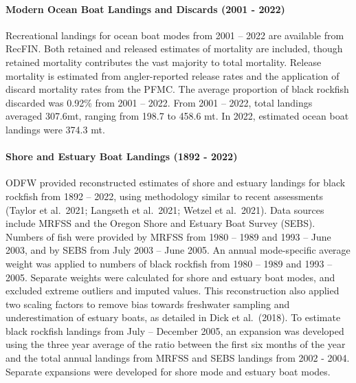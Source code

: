 \documentclass[11pt,
  english,
  letterpaper,
]{article}
\begin{document}
\hypertarget{modern-ocean-boat-landings-and-discards-2001---2022}{%
\paragraph{Modern Ocean Boat Landings and Discards (2001 - 2022)}\label{modern-ocean-boat-landings-and-discards-2001---2022}}

Recreational landings for ocean boat modes from 2001 -- 2022 are available from RecFIN. Both retained and released estimates of mortality are included, though retained mortality contributes the vast majority to total mortality. Release mortality is estimated from angler-reported release rates and the application of discard mortality rates from the PFMC. The average proportion of black rockfish discarded was 0.92\% from 2001 -- 2022. From 2001 -- 2022, total landings averaged 307.6mt, ranging from 198.7 to 458.6 mt. In 2022, estimated ocean boat landings were 374.3 mt.

\hypertarget{shore-and-estuary-boat-landings-1892---2022}{%
\paragraph{Shore and Estuary Boat Landings (1892 - 2022)}\label{shore-and-estuary-boat-landings-1892---2022}}

ODFW provided reconstructed estimates of shore and estuary landings for black rockfish from 1892 -- 2022, using methodology similar to recent assessments (Taylor et al.~2021; Langseth et al.~2021; Wetzel et al.~2021). Data sources include MRFSS and the Oregon Shore and Estuary Boat Survey (SEBS). Numbers of fish were provided by MRFSS from 1980 -- 1989 and 1993 -- June 2003, and by SEBS from July 2003 -- June 2005. An annual mode-specific average weight was applied to numbers of black rockfish from 1980 -- 1989 and 1993 -- 2005. Separate weights were calculated for shore and estuary boat modes, and excluded extreme outliers and imputed values. This reconstruction also applied two scaling factors to remove bias towards freshwater sampling and underestimation of estuary boats, as detailed in Dick et al.~(2018). To estimate black rockfish landings from July -- December 2005, an expansion was developed using the three year average of the ratio between the first six months of the year and the total annual landings from MRFSS and SEBS landings from 2002 - 2004. Separate expansions were developed for shore mode and estuary boat modes.
\end{document}
